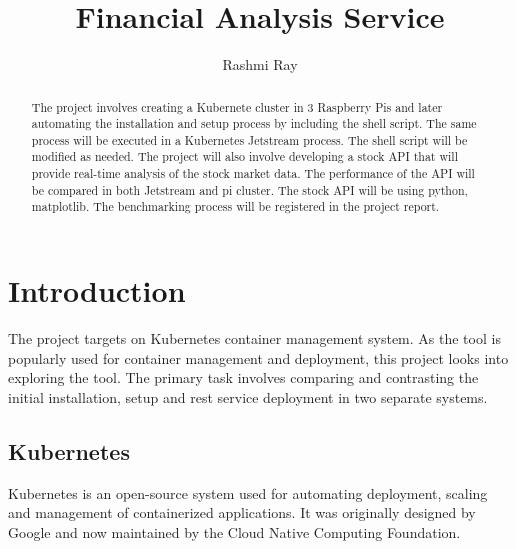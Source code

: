 
\title{Financial Analysis Service}

\author{Rashmi Ray}

\renewcommand{\shortauthors}{Uma Kugan}

\begin{abstract}
The project involves creating a Kubernete cluster in 3 Raspberry Pis and later 
automating the installation and setup process by including the shell script.
The same process will be executed in a Kubernetes Jetstream process. The shell
script will be modified as needed. The project will also involve developing a stock 
API that will provide real-time analysis of the stock market data. The performance
of the API will be compared in both Jetstream and pi cluster. The stock API will 
be using python, matplotlib. The benchmarking process will be registered in the project report.

\end{abstract}



\maketitle

\section{Introduction}
The project targets on Kubernetes container management system. As the tool is popularly used
for container management and deployment, this project looks into exploring the tool.
The primary task involves comparing and contrasting the initial installation, 
setup and rest service deployment in two separate systems.  



\subsection{Kubernetes}
Kubernetes is an open-source system used for automating deployment, 
scaling and management of containerized applications. It was originally 
designed by Google and now maintained by the Cloud Native Computing 
Foundation.\cite{hid-sp18-417-kubernetes}

